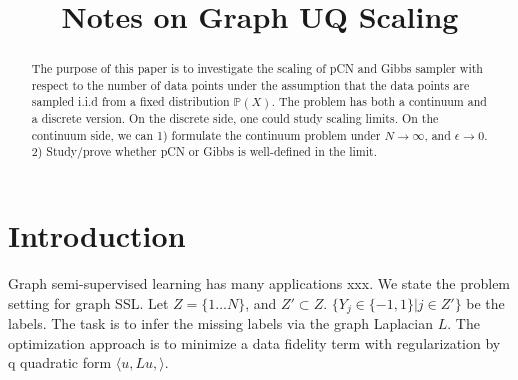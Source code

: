 \documentclass[final]{siamart0516}
\title{Notes on Graph UQ Scaling}
\newcommand{\bbP}{\mathbb{P}}
\begin{document}
\maketitle

\begin{abstract}
The purpose of this paper is to investigate the scaling of pCN and Gibbs sampler with respect to the number of data points under the assumption that the data points are sampled i.i.d from a fixed distribution $\bbP(X)$.  The problem has both a continuum and a discrete version. On the discrete side, one could study scaling limits.  On the continuum side, we can 1) formulate the continuum problem under $N\rightarrow \infty$, and $\epsilon \rightarrow 0$.  2) Study/prove whether pCN or Gibbs is well-defined in the limit. 
\end{abstract}

\section{Introduction}

Graph semi-supervised learning has many applications xxx. We state the problem setting for graph SSL. Let $Z = \{1\dots N\}$, and $Z' \subset Z$. $\{Y_j \in \{-1, 1\} | j\in Z'\}$ be the labels. The task is to infer the missing labels via the graph Laplacian $L$.  The optimization approach is to minimize a data fidelity term with regularization by q quadratic form $\langle u, Lu,\rangle$. 
\end{document}
